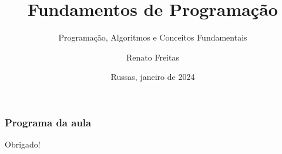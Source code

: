 \documentclass[11pt]{beamer}
\begin{document}
	\title{Fundamentos de Programação}
	\subtitle{Programação, Algoritmos e Conceitos Fundamentais}
	\author{Renato Freitas}
	\date{Russas, janeiro de 2024}
	\begin{frame}[plain]
		\maketitle
	\end{frame}
	
	
	\begin{frame}
		\frametitle{Programa da aula}
		\tableofcontents
	\end{frame}





\begin{frame}[plain]
	\maketitle
	\centering
	Obrigado!
\end{frame}
\end{document}
